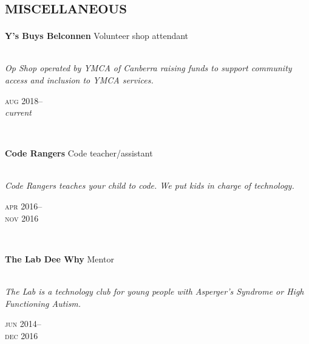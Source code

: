 

\section*{\textsc{miscellaneous}}
\vspace{-0.2cm}

\begin{minipage}[t]{0.75\textwidth}
\textbf{Y's Buys Belconnen}\phantom{..} Volunteer shop attendant\\
\\
{\small
\textit{Op Shop operated by YMCA of Canberra raising funds to support community access and inclusion to YMCA services.}
\par}
\end{minipage}
\begin{minipage}[t]{0.25\textwidth}
{
\hfill \textsc{aug} 2018--\\ 
\hspace*{0pt} \hfill \textit{current}
\par
}
\end{minipage}
\\

\begin{minipage}[t]{0.75\textwidth}
\textbf{Code Rangers}\phantom{..} Code teacher/assistant \\
\\
{\small
\textit{Code Rangers teaches your child to code. We put kids in charge of technology.}
\par}
\end{minipage}
\begin{minipage}[t]{0.25\textwidth}
{
\hfill \textsc{apr} 2016--\\ 
\hspace*{0pt} \hfill \textsc{nov} 2016
\par
}
\end{minipage}
\\

\begin{minipage}[t]{0.75\textwidth}
\textbf{The Lab Dee Why}\phantom{..} Mentor \\
\\
{\small
\textit{The Lab is a technology club for young people with Asperger’s Syndrome or High Functioning Autism.}
\par}
\end{minipage}
\begin{minipage}[t]{0.25\textwidth}
{
\hfill \textsc{jun} 2014--\\ 
\hspace*{0pt} \hfill \textsc{dec} 2016
\par
}
\end{minipage}
\\

